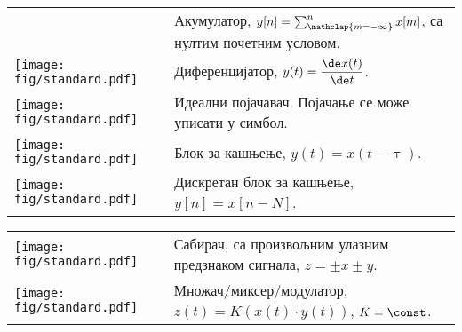 \begin{tabular}{ll}
\begin{minipage}{0.1\textwidth}
    \end{minipage}
    & 
    \begin{minipage}{0.8\textwidth}
        Акумулатор, $y[n] = \sum_{\mathclap{m = -\infty}}^{n} x[m]$,
        са нултим почетним условом.
    \end{minipage}
    \\[5mm]
    \begin{minipage}{0.1\textwidth}
        \texttt{[image: fig/standard.pdf]}     
    \end{minipage}
    & 
    \begin{minipage}{0.8\textwidth}
        Диференцијатор, $y(t) = \dfrac{\de x(t)}{\de t}$. 
    \end{minipage}
    \\[5mm]
    \begin{minipage}{0.1\textwidth}
        \texttt{[image: fig/standard.pdf]}     
    \end{minipage}
    & 
    \begin{minipage}{0.8\textwidth}
        Идеални појачавач. Појачање се може уписати у симбол. 
    \end{minipage}
    \\[5mm]
    \begin{minipage}{0.1\textwidth}
        \texttt{[image: fig/standard.pdf]}     
    \end{minipage}
    & 
    \begin{minipage}{0.8\textwidth}
        Блок за кашњење, $y(t) = x(t-\uptau)$. 
    \end{minipage}
    \\[5mm]
    \begin{minipage}{0.1\textwidth}
        \texttt{[image: fig/standard.pdf]}     
    \end{minipage}
    & 
    \begin{minipage}{0.8\textwidth}
        Дискретан блок за кашњење, $y[n] = x[n - N]$. 
    \end{minipage}
\end{tabular}

\noindent
\begin{tabular}{ll}
    \begin{minipage}{0.1\textwidth}
        \texttt{[image: fig/standard.pdf]}     
    \end{minipage}
    & 
    \begin{minipage}{0.8\textwidth}
        Сабирач, са произвољним улазним предзнаком сигнала, $z = \pm x \pm y$.
    \end{minipage}
    \\[5mm]
    \begin{minipage}{0.1\textwidth}
        \texttt{[image: fig/standard.pdf]}     
    \end{minipage}
    & 
    \begin{minipage}{0.8\textwidth}
        Множач/миксер/модулатор, $z(t) = K ( x(t)\cdot y(t))$, $K = \const$.
    \end{minipage}
\end{tabular}

